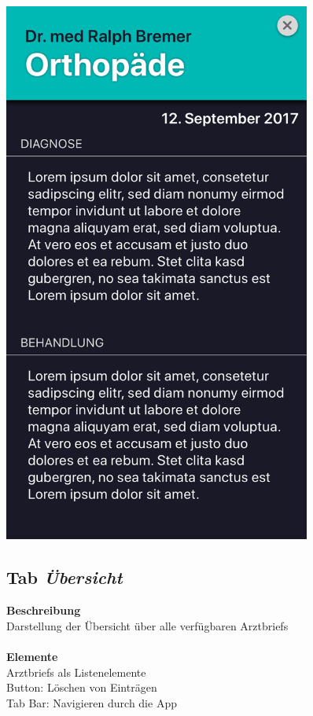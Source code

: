 \documentclass[a4paper]{scrreprt}
\begin{document}
\begin{figure}
\begin{minipage}[t][][b]{0.4\textwidth}
\includegraphics[width=0.9\textwidth]{mockups/ArztbriefDetailed}
\end{minipage}%
\hfill
\begin{minipage}[t][][b]{0.65\textwidth}

\subsection*{Tab \textit{Übersicht}}
\textbf{Beschreibung}\\
{Darstellung der Übersicht über alle verfügbaren \glspl{Arztbrief}}\\
~\\
\textbf{Elemente}\\
{\glspl{Arztbrief} als Listenelemente}\\
{Button: Löschen von Einträgen}\\
{Tab Bar: Navigieren durch die App}\\


\end{minipage}
\end{figure}
\end{document}
